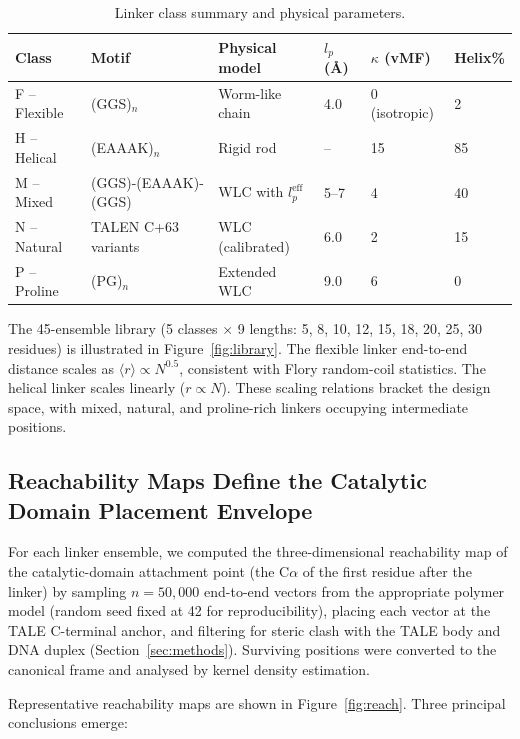 \documentclass[11pt,a4paper]{article}
\newcommand{\angstrom}{\AA}
\begin{document}
\begin{table}[H]
\centering
\caption{Linker class summary and physical parameters.}
\label{tab:linker_classes}
\begin{tabularx}{\textwidth}{llXlll}
\toprule
Class & Motif & Physical model & $l_p$ (\angstrom) & $\kappa$ (vMF) & Helix\% \\
\midrule
F -- Flexible & (GGS)$_n$ & Worm-like chain & 4.0 & 0 (isotropic) & 2 \\
H -- Helical  & (EAAAK)$_n$ & Rigid rod & -- & 15 & 85 \\
M -- Mixed    & (GGS)-(EAAAK)-(GGS) & WLC with $l_p^\mathrm{eff}$ & 5--7 & 4 & 40 \\
N -- Natural  & TALEN C+63 variants & WLC (calibrated) & 6.0 & 2 & 15 \\
P -- Proline  & (PG)$_n$ & Extended WLC & 9.0 & 6 & 0 \\
\bottomrule
\end{tabularx}
\end{table}

The 45-ensemble library (5 classes $\times$ 9 lengths: 5, 8, 10, 12, 15, 18, 20, 25,
30 residues) is illustrated in Figure~\ref{fig:library}. The flexible linker
end-to-end distance scales as $\langle r \rangle \propto N^{0.5}$, consistent with
Flory random-coil statistics. The helical linker scales linearly ($r \propto N$).
These scaling relations bracket the design space, with mixed, natural, and proline-rich
linkers occupying intermediate positions.

\subsection{Reachability Maps Define the Catalytic Domain Placement Envelope}
\label{subsec:reach}

For each linker ensemble, we computed the three-dimensional reachability map of the
catalytic-domain attachment point (the C$\alpha$ of the first residue after the linker) by
sampling $n = 50{,}000$ end-to-end vectors from the appropriate polymer model
(random seed fixed at 42 for reproducibility), placing each vector at the TALE C-terminal
anchor, and filtering for steric clash with the TALE body and DNA duplex
(Section~\ref{sec:methods}). Surviving positions were converted to the canonical frame
and analysed by kernel density estimation.

Representative reachability maps are shown in Figure~\ref{fig:reach}. Three principal
conclusions emerge:
\end{document}
